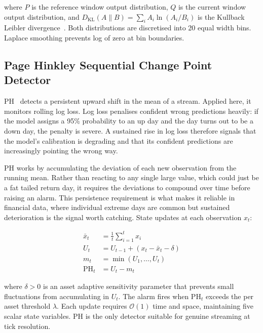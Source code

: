 where $P$ is the reference window output distribution, $Q$ is the current window output distribution, and $D_{\text{KL}}(A \| B) = \sum_i A_i \ln(A_i / B_i)$ is the Kullback Leibler divergence~\cite{lin1991,shannon1948,kullback1951}. Both distributions are discretised into 20 equal width bins. Laplace smoothing prevents log of zero at bin boundaries.

\subsection{Page Hinkley Sequential Change Point Detector}
\label{subsec:ph}

PH~\cite{page1954,mouss2004} detects a persistent upward shift in the mean of a stream. Applied here, it monitors rolling log loss. Log loss penalises confident wrong predictions heavily: if the model assigns a 95\% probability to an up day and the day turns out to be a down day, the penalty is severe. A sustained rise in log loss therefore signals that the model's calibration is degrading and that its confident predictions are increasingly pointing the wrong way.

PH works by accumulating the deviation of each new observation from the running mean. Rather than reacting to any single large value, which could just be a fat tailed return day, it requires the deviations to compound over time before raising an alarm. This persistence requirement is what makes it reliable in financial data, where individual extreme days are common but sustained deterioration is the signal worth catching. State updates at each observation $x_t$:

\begin{align}
  \bar{x}_t  &= \frac{1}{t} \sum_{i=1}^{t} x_i  \label{eq:ph_mean} \\
  U_t        &= U_{t-1} + (x_t - \bar{x}_t - \delta) \label{eq:ph_sum} \\
  m_t        &= \min(U_1, \ldots, U_t) \label{eq:ph_min} \\
  \text{PH}_t &= U_t - m_t \label{eq:ph_stat}
\end{align}

where $\delta > 0$ is an asset adaptive sensitivity parameter that prevents small fluctuations from accumulating in $U_t$. The alarm fires when $\text{PH}_t$ exceeds the per asset threshold $\lambda$. Each update requires $\mathcal{O}(1)$ time and space, maintaining five scalar state variables. PH is the only detector suitable for genuine streaming at tick resolution.

